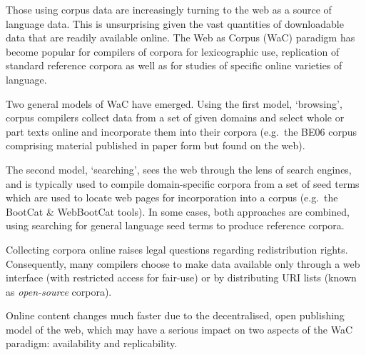 
Those using corpus data are increasingly turning to the web as a source of language data. This is unsurprising given the vast quantities of downloadable data that are readily available online. The Web as Corpus (WaC) paradigm\cite{kilgarriff2003introduction} has become popular for compilers of corpora for lexicographic use, replication of standard reference corpora as well as for studies of specific online varieties of language. 

Two general models of WaC have emerged. Using the first model, `browsing', corpus compilers collect data from a set of given domains and select whole or part texts online and incorporate them into their corpora (e.g.\ the BE06\cite{baker2009be06} corpus comprising material published in paper form but found on the web).

The second model, `searching', sees the web through the lens of search engines, and is typically used to compile domain-specific corpora from a set of seed terms which are used to locate web pages for incorporation into a corpus (e.g.\ the BootCat \& WebBootCat tools\cite{baroni2004bootcat}). %
In some cases, both approaches are combined, using searching for general language seed terms to produce reference corpora\cite{kilgarriff2010corpus}.

Collecting corpora online raises legal questions regarding redistribution rights.  Consequently, many compilers choose to make data available only through a web interface (with restricted access for fair-use) or by distributing URI lists (known as \textsl{open-source} corpora\cite{sharoff2006open}).



Online content changes much faster due to the decentralised, open publishing model of the web, which may have a serious impact on two aspects of the WaC paradigm: availability and replicability.

